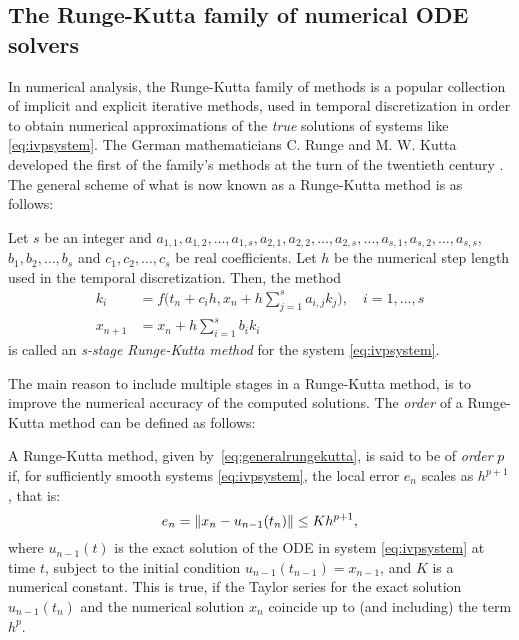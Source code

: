 \subsection{The Runge-Kutta family of numerical ODE solvers}
\label{sub:the_runge_kutta_family_of_numerical_methods}

In numerical analysis, the Runge-Kutta family of methods is a popular
collection of implicit and explicit iterative methods, used in temporal
discretization in order to obtain numerical approximations of the \emph{true}
solutions of systems like \eqref{eq:ivpsystem}. The German mathematicians C.
Runge and M. W. Kutta developed the first of the family's methods at the turn
of the twentieth century \parencite[p.134]{hairer1993solving}. The general
scheme of what is now known as a Runge-Kutta method is as follows: \\

\begin{defn}
    \label{def:generalrungekutta}
    Let $s$ be an integer and $a_{1,1},a_{1,2},\ldots,a_{1,s},a_{2,1},
    a_{2,2},\ldots,a_{2,s},\ldots,a_{s,1},a_{s,2},\ldots,a_{s,s}$,
    $b_{1},b_{2},\ldots,b_{s}$ and $c_{1},c_{2},\ldots,c_{s}$ be real
    coefficients. Let $h$ be the numerical step length used in the
    temporal discretization. Then, the method
\begin{equation}
    \label{eq:generalrungekutta}
    \begin{aligned}
        k_{i} &= f\bigg(t_{n}+c_{i}h,x_{n}+
                h\sum\limits_{j=1}^{s}a_{i,j}k_{j}\bigg),\quad{}i=1,\ldots,s\\
        x_{n+1} &= x_{n} + h\sum\limits_{i=1}^{s}b_{i}k_{i}
    \end{aligned}
\end{equation}
is called an \emph{s-stage Runge-Kutta method} for the system
\eqref{eq:ivpsystem}.
\end{defn}

The main reason to include multiple stages in a Runge-Kutta method,
is to improve the numerical accuracy of the computed solutions.
The \emph{order} of a Runge-Kutta method can be defined as follows:\\

\begin{defn}
    \label{def:rungekuttaorder}
    A Runge-Kutta method, given by~\cref{eq:generalrungekutta}, is
    said to be of \emph{order} $p$ if, for sufficiently smooth systems
    \eqref{eq:ivpsystem}, the local error $e_{n}$ scales as $h^{p+1}$, that is:
    \begin{equation}
        \label{eq:rungekuttaorder}
        e_{n}=\norm{x_{n}-u_{n-1}(t_{n})} \leq Kh^{p+1},
    \end{equation}
    where $u_{n-1}(t)$ is the exact solution of the ODE in system
    \eqref{eq:ivpsystem} at time $t$, subject to the initial condition
    $u_{n-1}(t_{n-1})=x_{n-1}$, and $K$ is a numerical constant. This is true,
    if the Taylor series for the exact solution $u_{n-1}(t_{n})$ and the
    numerical solution $x_{n}$ coincide up to (and including) the term $h^p$.
\end{defn}

